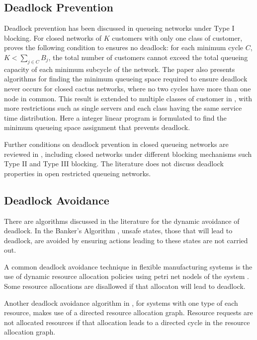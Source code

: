 \documentclass{article}
\numberwithin{equation}{section}
\begin{document}
\subsection{Deadlock Prevention}

Deadlock prevention has been discussed in queueing networks under Type I blocking.
For closed networks of $K$ customers with only one class of customer, \cite{kunduakyildiz89} proves the following condition to ensures no deadlock: for each minimum cycle $C$, $K < \sum_{j\in C} B_j$, the total number of customers cannot exceed the total queueing capacity of each minimum subcycle of the network.
The paper also presents algorithms for finding the minimum queueing space required to ensure deadlock never occurs for closed cactus networks, where no two cycles have more than one node in common.
This result is extended to multiple classes of customer in \cite{liebeherrakyildiz95}, with more restrictions such as single servers and each class having the same service time distribution.
Here a integer linear program is formulated to find the minimum queueing space assignment that prevents deadlock.

Further conditions on deadlock prvention in closed queueing networks are reviewed in \cite{onvural90}, including closed networks under different blocking mechanisms such Type II and Type III blocking.
The literature does not discuss deadlock properties in open restricted queueing networks.


\subsection{Deadlock Avoidance}

There are algorithms discussed in the literature for the dynamic avoidance of deadlock.
In the Banker's Algorithm \cite{dijkstra82, kawadkaretal14}, unsafe states, those that will lead to deadlock, are avoided by ensuring actions leading to these states are not carried out.

A common deadlock avoidance technique in flexible manufacturing systems is the use of dynamic resource allocation policies using petri net nodels of the system \cite{viswanadhametal90, ezpeletaetal02}.
Some resource allocations are disallowed if that allocaton will lead to deadlock.

Another deadlock avoidance algorithm in \cite{belik90}, for systems with one type of each resource, makes use of a directed resource allocation graph. Resource requests are not allocated resources if that allocation leads to a directed cycle in the resource allocation graph.
\end{document}
